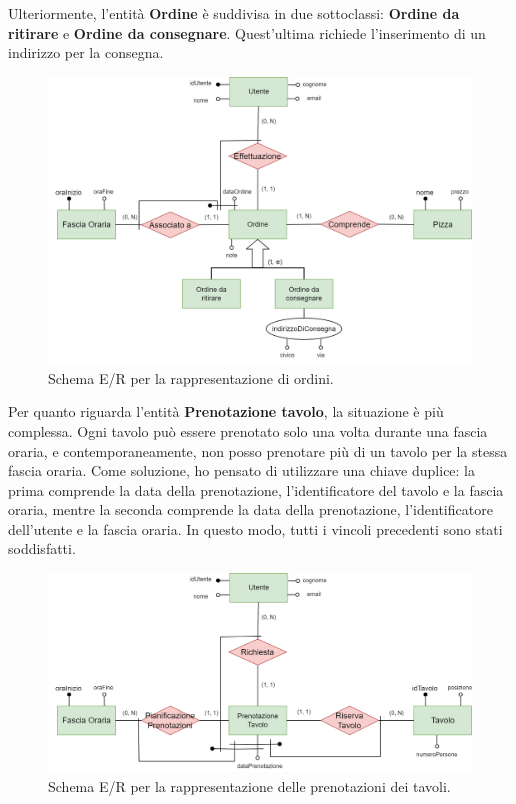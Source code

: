\documentclass[a4paper,12pt, oneside]{article}
\begin{document}
Ulteriormente, l'entità \textbf{Ordine} è suddivisa in due
sottoclassi: \textbf{Ordine da ritirare} e
\textbf{Ordine da consegnare}. Quest'ultima richiede
l'inserimento di un indirizzo per la consegna.

\begin{figure}[ht]
    \centering
    \includegraphics[width=1\textwidth]{images/diagramma_ordine.png}
    \caption{Schema E/R per la rappresentazione di ordini.}
    \label{fig:diagramma_ordine}
\end{figure}

Per quanto riguarda l'entità \textbf{Prenotazione tavolo}, la
situazione è più complessa. Ogni tavolo può essere prenotato solo una
volta durante una fascia oraria, e contemporaneamente, non posso
prenotare più di un tavolo per la stessa fascia oraria. Come soluzione,
ho pensato di utilizzare una chiave duplice: la prima comprende la data
della prenotazione, l'identificatore del tavolo e la fascia oraria,
mentre la seconda comprende la data della prenotazione,
l'identificatore dell'utente e la fascia oraria. In questo modo, tutti
i vincoli precedenti sono stati soddisfatti.

\begin{figure}[ht]
    \centering
    \includegraphics[width=1\textwidth]{images/diagramma_tavolo.png}
    \caption{Schema E/R per la rappresentazione delle prenotazioni dei tavoli.}
    \label{fig:diagramma_tavolo}
\end{figure}
\end{document}
